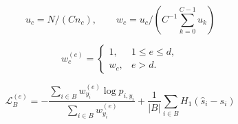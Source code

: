 \begin{equation}
u_c=N/(C n_c),\qquad w_c=u_c/(C^{-1}\sum_{k=0}^{C-1}u_k)\tag{1}
\end{equation}

\begin{equation}
w_c^{(e)}=\begin{cases}1,&1\le e\le d,\\w_c,&e>d.\end{cases}\tag{2}
\end{equation}

\begin{equation}
\mathcal L_B^{(e)}=-\frac{\sum_{i\in B}w_{y_i}^{(e)}\log p_{i,y_i}}{\sum_{i\in B}w_{y_i}^{(e)}}+\frac{1}{|B|}\sum_{i\in B}H_1(\hat s_i-s_i)\tag{3}
\end{equation}